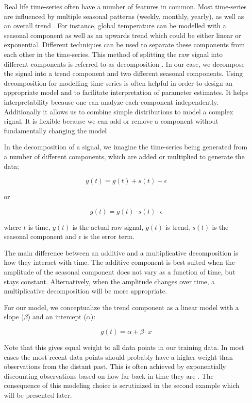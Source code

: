 \documentclass{article}
\begin{document}
Real life time-series often have a number of features in common. Most time-series are influenced by multiple seasonal patterns (weekly, monthly, yearly), as well as an overall trend \cite{taylor2018forecasting}. For instance, global temperature can be modelled with a seasonal component as well as an upwards trend which could be either linear or exponential. Different techniques can be used to separate these components from each other in the time-series. This method of splitting the raw signal into different components is referred to as decomposition \cite{fpp3, taylor2018forecasting}. In our case, we decompose the signal into a trend component and two different seasonal components. Using decomposition for modelling time-series is often helpful in order to design an appropriate model and to facilitate interpretation of parameter estimates. It helps interpretability because one can analyze each component independently. Additionally it allows us to combine simple distributions to model a complex signal. It is flexible because we can add or remove a component without fundamentally changing the model \cite{taylor2018forecasting}. 

In the decomposition of a signal, we imagine the time-series being generated from a number of different components, which are added or multiplied to generate the data;

$$y(t) = g(t) + s(t) + \epsilon$$

\begin{center}
    or
\end{center}

$$y(t) = g(t) \cdot s(t) \cdot \epsilon $$

where $t$ is time, $y(t)$ is the actual raw signal, $g(t)$ is trend, $s(t)$ is the seasonal component and $\epsilon$ is the error term. 

The main difference between an additive and a multiplicative decomposition is how they interact with time. The additive component is best suited when the amplitude of the seasonal component does not vary as a function of time, but stays constant. Alternatively, when the amplitude changes over time, a multiplicative decomposition will be more appropriate. 

For our model, we conceptualize the trend component as a linear model with a slope ($\beta$) and an intercept ($\alpha$):

$$g(t) = \alpha + \beta \cdot x$$

Note that this gives equal weight to all data points in our training data. In most cases the most recent data points should probably have a higher weight than observations from the distant past. This is often achieved by exponentially discounting observations based on how far back in time they are \cite{gilchrist1967methods}. The consequence of this modeling choice is scrutinized in the second example which will be presented later.
\end{document}
